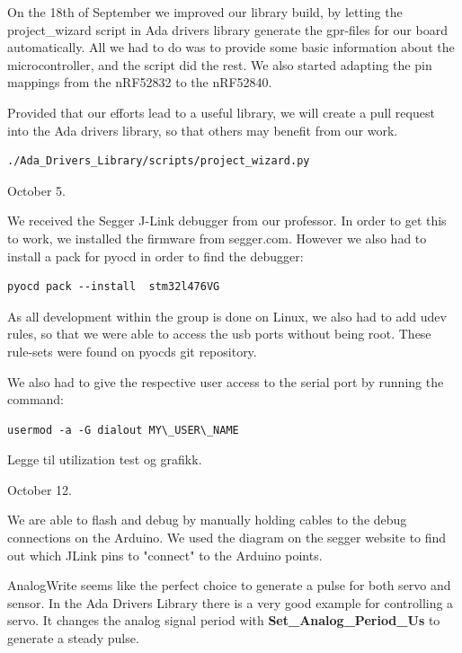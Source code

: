 \documentclass{article}
\begin{document}
\vspace{5mm}
On the 18th of September we improved our library build, by letting the project\_wizard script in Ada drivers library generate the gpr-files for our board automatically. All we had to do was to provide some basic information about the microcontroller, and the script did the rest. We also started adapting the pin mappings from the nRF52832 to the nRF52840. 

Provided that our efforts lead to a useful library, we will create a pull request into the Ada drivers library, so that others may benefit from our work. 

\begin{lstlisting}
./Ada_Drivers_Library/scripts/project_wizard.py
\end{lstlisting}

\vspace{5mm}

October 5. 

We received the Segger J-Link debugger from our professor. In order to get this to work, we installed the firmware from segger.com. However we also had to install a pack for pyocd in order to find the debugger:


\begin{lstlisting}
pyocd pack --install  stm32l476VG
\end{lstlisting}

As all development within the group is done on Linux, we also had to add udev rules, so that we were able to access the usb ports without being root. These rule-sets were found on pyocds git repository.

We also had to give the respective user access to the serial port by running the command: 
\begin{lstlisting}
usermod -a -G dialout MY\_USER\_NAME
\end{lstlisting}

Legge til utilization test og grafikk.
\vspace{5mm}

October 12. 

We are able to flash and debug by manually holding cables to the debug connections on the Arduino. We used the diagram on the segger website \cite{JLINK} to find out which JLink pins to "connect" to the Arduino points.

AnalogWrite seems like the perfect choice to generate a pulse for both servo and sensor. In the Ada Drivers Library \cite{ADADRIVERSLIBRARY} there is a very good example for controlling a servo. It changes the analog signal period with \textbf{Set\_Analog\_Period\_Us} to generate a steady pulse.
\end{document}
